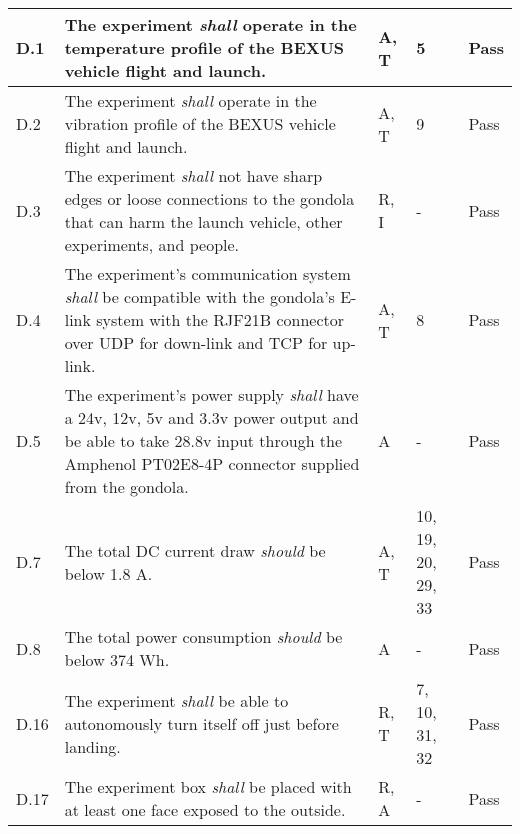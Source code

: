 \begin{longtable}[]{|m{}| m{} |m{} |m{}|m{}|}
D.1  & The experiment \textit{shall} operate in the temperature profile of the BEXUS vehicle flight and launch.\cite{BexusManual}                                                                         &       A, T       & 5            & Pass     \\ \hline
D.2  & The experiment \textit{shall} operate in the vibration profile of the BEXUS vehicle flight and launch.\cite{BexusManual}                                                                          &       A, T       & 9            &  Pass \\ \hline %
D.3  & The experiment \textit{shall} not have sharp edges or loose connections to the gondola that can harm the launch vehicle, other experiments, and people.                                                                                                           &      R, I      & -          &   Pass     \\ \hline %
D.4  & The experiment's communication system \textit{shall} be compatible with the gondola's E-link system with the RJF21B connector over UDP for down-link and TCP for up-link.                                                                             &      A, T        & 8            &    Pass \\  \hline%
D.5  & The experiment's power supply \textit{shall} have a 24v, 12v, 5v and 3.3v power output and be able to take 28.8v input through the Amphenol PT02E8-4P connector supplied from the gondola.                                                                                    &      A       &  -           & Pass      \\ \hline %
D.7  & The total DC current draw \textit{should} be below 1.8 A. &      A, T        & 10, 19, 20, 29, 33            & Pass        \\ \hline
D.8  & The total power consumption \textit{should} be below 374 Wh.& A & - & Pass \\ \hline %
D.16 & The experiment \textit{shall} be able to autonomously turn itself off just before landing.                                                                                       &       R, T      &  7, 10, 31, 32           &   Pass    \\ \hline
D.17 & The experiment box \textit{shall} be placed with at least one face exposed to the outside.                                                                                &     R, A         & -            &   Pass      

\end{longtable}
